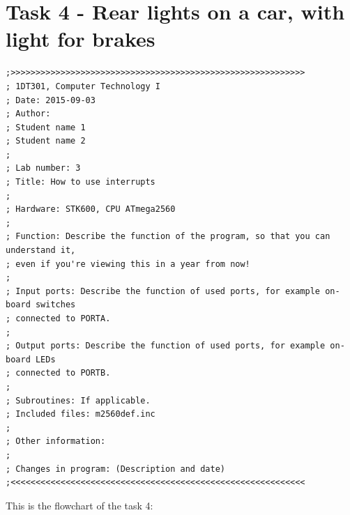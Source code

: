 \documentclass[a4paper,12pt]{article}
\begin{document}
\newpage
\section{Task 4 - Rear lights on a car, with light for brakes}

\lstset{style=Asm}
\begin{lstlisting}
;>>>>>>>>>>>>>>>>>>>>>>>>>>>>>>>>>>>>>>>>>>>>>>>>>>>>>>>>>>>
; 1DT301, Computer Technology I
; Date: 2015-09-03
; Author:
; Student name 1
; Student name 2
;
; Lab number: 3
; Title: How to use interrupts
;
; Hardware: STK600, CPU ATmega2560
;
; Function: Describe the function of the program, so that you can understand it,
; even if you're viewing this in a year from now!
;
; Input ports: Describe the function of used ports, for example on-board switches
; connected to PORTA.
;
; Output ports: Describe the function of used ports, for example on-board LEDs
; connected to PORTB.
;
; Subroutines: If applicable.
; Included files: m2560def.inc
;
; Other information:
;
; Changes in program: (Description and date)
;<<<<<<<<<<<<<<<<<<<<<<<<<<<<<<<<<<<<<<<<<<<<<<<<<<<<<<<<<<<
\end{lstlisting}

\newpage
This is the flowchart of the task 4:
\begin{center}
\end{center}


\end{document}
